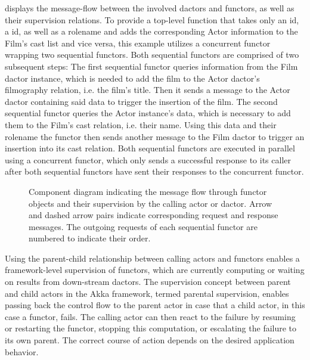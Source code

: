      displays the message-flow between the involved \glspl{dactor} and \glspl{functor}, as well as their supervision relations.
    To provide a top-level function that takes only an  id, a  id, as well as a rolename and adds the corresponding Actor information to the Film's cast list and vice versa, this example utilizes a concurrent \gls{functor} wrapping two sequential \glspl{functor}.
    Both sequential \glspl{functor} are comprised of two subsequent steps:
    The first sequential \gls{functor} queries information from the Film \gls{dactor} instance, which is needed to add the film to the Actor \gls{dactor}'s filmography \gls{relation}, i.e. the film's title.
    Then it sends a message to the Actor \gls{dactor} containing said data to trigger the insertion of the film.
    The second sequential \gls{functor} queries the Actor instance's data, which is necessary to add them to the Film's cast \gls{relation}, i.e. their name.
    Using this data and their rolename the \gls{functor} then sends another message to the Film \gls{dactor} to trigger an insertion into its cast \gls{relation}.
    Both sequential \glspl{functor} are executed in parallel using a concurrent \gls{functor}, which only sends a successful response to its caller after both sequential \glspl{functor} have sent their responses to the concurrent \gls{functor}.
    
    \begin{figure}
      \centering
      
      \caption{Component diagram indicating the message flow through \gls{functor} objects and their supervision by the calling actor or \gls{dactor}. Arrow and dashed arrow pairs indicate corresponding request and response messages. The outgoing requests of each sequential \gls{functor} are numbered to indicate their order.}
      \label{fig:functor_diagram}
    \end{figure}
    
    Using the parent-child relationship between calling actors and \glspl{functor} enables a framework-level supervision of \glspl{functor}, which are currently computing or waiting on results from down-stream \glspl{dactor}.
    The supervision concept between parent and child actors in the Akka framework, termed parental supervision, enables passing back the control flow to the parent actor in case that a child actor, in this case a \gls{functor}, fails.
    The calling actor can then react to the failure by resuming or restarting the \gls{functor}, stopping this computation, or escalating the failure to its own parent.
    The correct course of action depends on the desired application behavior.
  
